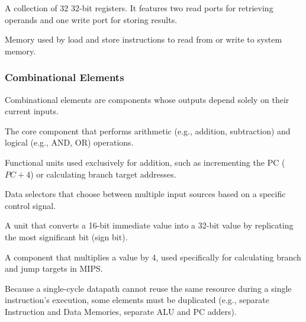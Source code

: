 \begin{vocabulary}
A collection of 32 32-bit registers. It features two read ports for retrieving operands and one write port for storing results.
\end{vocabulary}

\begin{vocabulary}
Memory used by load and store instructions to read from or write to system memory.
\end{vocabulary}

\subsubsection{Combinational Elements}
Combinational elements are components whose outputs depend solely on their current inputs.

\begin{vocabulary}
The core component that performs arithmetic (e.g., addition, subtraction) and logical (e.g., AND, OR) operations.
\end{vocabulary}

\begin{vocabulary}[Adders]
Functional units used exclusively for addition, such as incrementing the PC ($PC + 4$) or calculating branch target addresses.
\end{vocabulary}

\begin{vocabulary}
Data selectors that choose between multiple input sources based on a specific control signal.
\end{vocabulary}

\begin{vocabulary}
A unit that converts a 16-bit immediate value into a 32-bit value by replicating the most significant bit (sign bit).
\end{vocabulary}

\begin{vocabulary}
A component that multiplies a value by 4, used specifically for calculating branch and jump targets in MIPS.
\end{vocabulary}

\begin{remark}
Because a single-cycle datapath cannot reuse the same resource during a single instruction's execution, some elements must be duplicated (e.g., separate Instruction and Data Memories, separate ALU and PC adders).
\end{remark}


